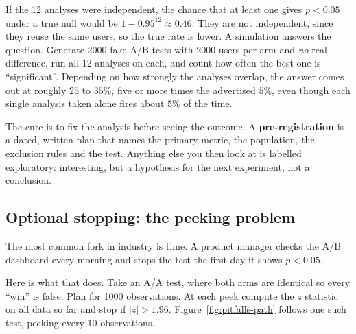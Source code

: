 If the 12 analyses were independent, the chance that at least one gives $p<0.05$
under a true null would be $1-0.95^{12}\approx 0.46$. They are not independent,
since they reuse the same users, so the true rate is lower. A simulation
answers the question. Generate 2000 fake A/B tests with 2000 users per arm and
\emph{no} real difference, run all 12 analyses on each, and count how often the best
one is ``significant''. Depending on how strongly the analyses overlap, the answer
comes out at roughly $25$ to $35\%$, five or more times the advertised $5\%$, even
though each single analysis taken alone fires about $5\%$ of the time.

The cure is to fix the analysis before seeing the outcome. A
\textbf{pre-registration} is a dated, written plan that names the primary metric,
the population, the exclusion rules and the test. Anything else you then look at
is labelled exploratory: interesting, but a hypothesis for the next experiment,
not a conclusion.

\subsection{Optional stopping: the peeking problem}

The most common fork in industry is time. A product manager checks the A/B
dashboard every morning and stops the test the first day it shows $p<0.05$.

Here is what that does. Take an A/A test, where both arms are identical so every
``win'' is false. Plan for 1000 observations. At each peek compute the $z$
statistic on all data so far and stop if $|z|>1.96$.
Figure~\ref{fig:pitfalls-path} follows one such test, peeking every 10
observations.

